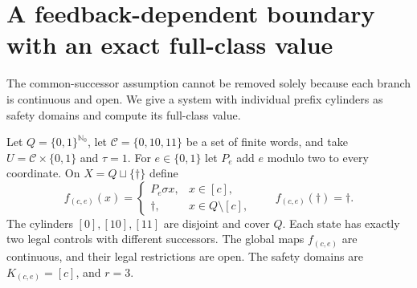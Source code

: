 \documentclass[11pt,reqno]{amsart}
\numberwithin{equation}{section}
\theoremstyle{definition}
\newcommand{\Nzero}{\mathbb N_0}
\begin{document}
\section{A feedback-dependent boundary with an exact full-class value}

The common-successor assumption cannot be removed solely because each
branch is continuous and open. We give a system with individual
prefix cylinders as safety domains and compute its full-class value.

Let $Q=\{0,1\}^{\Nzero}$, let $\mathcal C=\{0,10,11\}$ be a set of
finite words, and take $U=\mathcal C\times\{0,1\}$ and $\tau=1$.
For $e\in\{0,1\}$ let $P_e$ add $e$ modulo two to every coordinate.
On $X=Q\sqcup\{\dagger\}$ define
\begin{equation}\label{cc-eq:boundarysystem}
 f_{(c,e)}(x)=
 \begin{cases}P_e\sigma x,&x\in[c],\\
 \dagger,&x\in Q\setminus[c],\end{cases}
 \qquad f_{(c,e)}(\dagger)=\dagger.
\end{equation}
The cylinders $[0],[10],[11]$ are disjoint and cover $Q$. Each state
has exactly two legal controls with different successors. The global
maps $f_{(c,e)}$ are continuous, and their legal restrictions are open.
The safety domains are $K_{(c,e)}=[c]$, and $r=3$.
\end{document}
